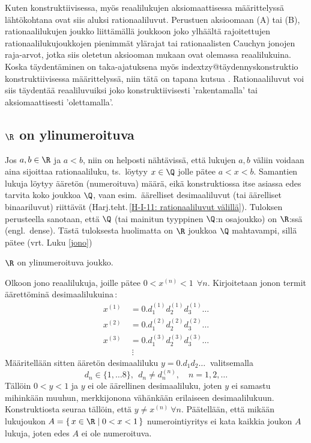 Kuten konstruktiivisessa, myös reaalilukujen aksiomaattisessa määrittelyssä lähtökohtana ovat 
siis aluksi rationaaliluvut. Perustuen aksioomaan (A) tai (B), rationaalilukujen joukko 
 liittämällä joukkoon joko ylhäältä rajoitettujen rationaalilukujoukkojen 
pienimmät ylärajat tai rationaalisten Cauchyn jonojen raja-arvot, jotka siis oletetun aksiooman
mukaan ovat olemassa reaalilukuina. Koska täydentäminen on taka-ajatuksena myös
index{tzy@täydennyskonstruktio}%
konstruktiivisessa määrittelyssä, niin tätä on tapana kutsua .
Rationaaliluvut voi siis täydentää reaaliluvuiksi joko konstruktiivisesti 'rakentamalla' tai
aksiomaattisesti 'olettamalla'.

\subsection{$\R$ on ylinumeroituva}
%

Jos $a,b \in \R$ ja $a<b$, niin on helposti nähtävissä, että lukujen $a,b$ väliin voidaan aina
sijoittaa rationaaliluku, ts.\ löytyy $x \in \Q$ jolle pätee $a<x<b$. Samantien lukuja löytyy
ääretön (numeroituva) määrä, eikä konstruktiossa itse asiassa edes tarvita koko joukkoa $\Q$,
vaan esim.\ äärelliset desimaaliluvut (tai äärelliset binaariluvut) riittävät
(Harj.teht.\,\ref{H-I-11: rationaaliluvut välillä}). Tuloksen perusteella sanotaan, että $\Q$
%
(tai mainitun tyyppinen $\Q$:n osajoukko) on $\R$:ssä  (engl.\ dense). Tästä 
tuloksesta huolimatta on $\R$ joukkoa $\Q$ mahtavampi, sillä pätee (vrt. Luku \ref{jono})
\begin{Lause} \label{R on ylinumeroituva} $\R$ on ylinumeroituva joukko. 
\end{Lause}
\tod Olkoon  jono reaalilukuja, joille pätee $0 < x^{(n)} < 1\ \ \forall n$. 
Kirjoitetaan jonon termit äärettöminä desimaalilukuina\,:
\begin{align*}
x^{(1)}\ &= 0.d_1^{(1)}d_2^{(1)}d_3^{(1)} \ldots \\
x^{(2)}\ &= 0.d_1^{(2)}d_2^{(2)}d_3^{(2)} \ldots \\
x^{(3)}\ &= 0.d_1^{(3)}d_2^{(3)}d_3^{(3)} \ldots \\
          &\ \vdots
\end{align*}
Määritellään sitten ääretön desimaaliluku $y = 0.d_1d_2 \ldots\ $ valitsemalla 
\[
d_n \in \{1,\ldots 8\},\ \ d_n \neq d_n^{(n)}, \quad n = 1,2, \ldots
\] 
Tällöin $0<y<1$ ja $y$ ei ole äärellinen desimaaliluku, joten $y$ ei samastu mihinkään muuhun,
merkkijonona vähänkään erilaiseen desimaalilukuun. Konstruktiosta seuraa tällöin, että 
$y \neq x^{(n)}\ \forall n$. Päätellään, että mikään lukujoukon 
$A = \{\,x \in \R \mid 0<x<1\,\}$ numerointiyritys ei kata kaikkia joukon $A$ lukuja, joten 
edes $A$ ei ole numeroituva. \loppu

